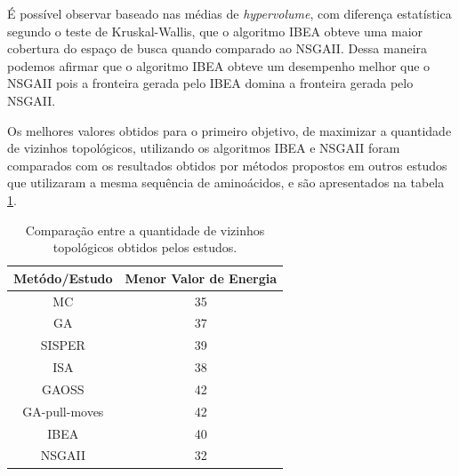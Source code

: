 \documentclass[conference]{IEEEtran}
\begin{document}
É possível observar baseado nas médias de \textit{hypervolume}, com diferença estatística segundo o teste de Kruskal-Wallis, que o algoritmo IBEA obteve uma maior cobertura do espaço de busca quando comparado ao NSGAII. Dessa maneira podemos afirmar que o algoritmo IBEA obteve um desempenho melhor que o NSGAII pois a fronteira gerada pelo IBEA domina a fronteira gerada pelo NSGAII.


\begin{table}[h]
	\centering
	\caption{Melhores configurações de parâmetros para os algoritmos}
	\label{tab:bestConfigs}
\end{table}

Os melhores valores obtidos para o primeiro objetivo, de maximizar a quantidade de vizinhos topológicos, utilizando os algoritmos IBEA e NSGAII foram comparados com os resultados obtidos por métodos propostos em outros estudos que utilizaram a mesma sequência de aminoácidos, e são apresentados na tabela \ref{tab:comparacao}.

\begin{table}[h]
	\centering
	\caption{Comparação entre a quantidade de vizinhos topológicos obtidos pelos estudos.}
	\label{tab:comparacao}
	\begin{tabular}{|c|c|}
		\hline
		{\bf Metódo/Estudo} & {\bf Menor Valor de Energia} \\ \hline
		MC \cite{unger1993genetic}               & 35                          \\ \hline
		GA   \cite{unger1993genetic}               & 37                          \\ \hline
		SISPER  \cite{zhang2002new}            & 39                          \\ \hline
		ISA \cite{huang2005improved}                & 38                          \\ \hline
		GAOSS  \cite{huang2010protein}             & 42                          \\ \hline
		GA-pull-moves \cite{li2012genetic}      & 42                          \\ \hline
		IBEA                & 40          \\ \hline 
		NSGAII & 32 \\
		\hline
	\end{tabular}
\end{table}
\end{document}
